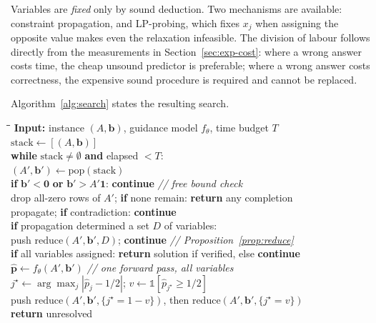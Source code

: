\documentclass[preprint,12pt]{elsarticle}
\begin{document}
Variables are \emph{fixed} only by sound deduction. Two mechanisms are available: constraint propagation, and LP-probing, which fixes $x_j$ when assigning the opposite value makes even the relaxation infeasible. The division of labour follows directly from the measurements in Section~\ref{sec:exp-cost}: where a wrong answer costs time, the cheap unsound predictor is preferable; where a wrong answer costs correctness, the expensive sound procedure is required and cannot be replaced.

Algorithm~\ref{alg:search} states the resulting search.

\begin{algorithm}[h]
\caption{Guided backtracking search for a BLS}
\label{alg:search}
\small
\begin{tabbing}
\hspace{6mm}\=\hspace{6mm}\=\hspace{6mm}\=\kill
\textbf{Input:} instance $(A,\mathbf{b})$, guidance model $f_\theta$, time budget $T$ \\
$\mathrm{stack} \gets [(A,\mathbf{b})]$ \\
\textbf{while} $\mathrm{stack}\ne\emptyset$ \textbf{and} elapsed $<T$: \\
\> $(A',\mathbf{b}') \gets \mathrm{pop}(\mathrm{stack})$ \\
\> \textbf{if} $\mathbf{b}' < \mathbf{0}$ \textbf{or} $\mathbf{b}' > A'\mathbf{1}$: \textbf{continue} \hfill \textit{// free bound check} \\
\> drop all-zero rows of $A'$; \textbf{if} none remain: \textbf{return} any completion \\
\> propagate; \textbf{if} contradiction: \textbf{continue} \\
\> \textbf{if} propagation determined a set $D$ of variables: \\
\> \> push $\mathrm{reduce}(A',\mathbf{b}',D)$; \textbf{continue} \hfill \textit{// Proposition~\ref{prop:reduce}} \\
\> \textbf{if} all variables assigned: \textbf{return} solution if verified, else \textbf{continue} \\
\> $\hat{\mathbf{p}} \gets f_\theta(A',\mathbf{b}')$ \hfill \textit{// one forward pass, all variables} \\
\> $j^\star \gets \arg\max_j |\hat{p}_j - 1/2|$; \quad $v \gets \mathbb{1}[\hat{p}_{j^\star}\ge 1/2]$ \\
\> push $\mathrm{reduce}(A',\mathbf{b}',\{j^\star{=}1{-}v\})$, then $\mathrm{reduce}(A',\mathbf{b}',\{j^\star{=}v\})$ \\
\textbf{return} unresolved
\end{tabbing}
\end{algorithm}
\end{document}
